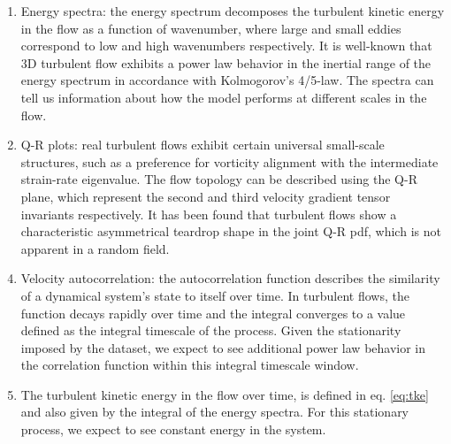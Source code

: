 \documentclass[book.tex]{subfiles}
\begin{document}
\begin{enumerate}
\item Energy spectra: the energy spectrum decomposes the turbulent kinetic energy in the flow as a function of wavenumber, where large and small eddies correspond to low and high wavenumbers respectively. It is well-known that 3D turbulent flow exhibits a power law behavior in the inertial range of the energy spectrum in accordance with Kolmogorov’s 4/5-law. The spectra can tell us information about how the model performs at different scales in the flow. 
\item Q-R plots: real turbulent flows exhibit certain universal small-scale structures, such as a preference for vorticity alignment with the intermediate strain-rate eigenvalue. The flow topology can be described using the Q-R plane, which represent the second and third velocity gradient tensor invariants respectively. It has been found that turbulent flows show a characteristic asymmetrical teardrop shape in the joint Q-R pdf, which is not apparent in a random field. %
\end{enumerate} 

\begin{enumerate}
  \setcounter{enumi}{3}
    \item Velocity autocorrelation: the autocorrelation function describes the similarity of a dynamical system’s state to itself over time. In turbulent flows, the function decays rapidly over time and the integral converges to a value defined as the integral timescale of the process. Given the stationarity imposed by the dataset, we expect to see additional power law behavior in the correlation function within this integral timescale window.
    \item The turbulent kinetic energy in the flow over time, is defined in eq. \ref{eq:tke} and also given by the integral of the energy spectra. For this stationary process, we expect to see constant energy in the system.
\end{enumerate}
\end{document}
